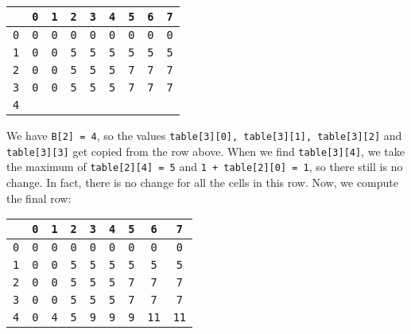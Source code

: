 \documentclass[a4paper, openany]{memoir}
\begin{document}
\begin{center}
    \begin{tabular}{|c|c|c|c|c|c|c|c|c|}
        \hline
         & \texttt{0} & \texttt{1} & \texttt{2} & \texttt{3} & \texttt{4} & \texttt{5} & \texttt{6} & \texttt{7} \\
        \hline
        \texttt{0} & \texttt{0} & \texttt{0} & \texttt{0} & \texttt{0} & \texttt{0} & \texttt{0} & \texttt{0} & \texttt{0} \\
        \hline
        \texttt{1} & \texttt{0} & \texttt{0} & \texttt{5} & \texttt{5} & \texttt{5} & \texttt{5} & \texttt{5} & \texttt{5} \\
        \hline
        \texttt{2} & \texttt{0} & \texttt{0} & \texttt{5} & \texttt{5} & \texttt{5} & \texttt{7} & \texttt{7} & \texttt{7} \\
        \hline
        \texttt{3} & \texttt{0} & \texttt{0} & \texttt{5} & \texttt{5} & \texttt{5} & \texttt{7} & \texttt{7} & \texttt{7} \\
        \hline
        \texttt{4} & & & & & & & & \\
        \hline
    \end{tabular}
\end{center}
We have \texttt{B[2] = 4}, so the values \texttt{table[3][0], table[3][1], table[3][2]} and \texttt{table[3][3]} get copied from the row above. When we find \texttt{table[3][4]}, we take the maximum of \texttt{table[2][4] = 5} and \texttt{1 + table[2][0] = 1}, so there still is no change. In fact, there is no change for all the cells in this row. Now, we compute the final row:
\begin{center}
    \begin{tabular}{|c|c|c|c|c|c|c|c|c|}
        \hline
         & \texttt{0} & \texttt{1} & \texttt{2} & \texttt{3} & \texttt{4} & \texttt{5} & \texttt{6} & \texttt{7} \\
        \hline
        \texttt{0} & \texttt{0} & \texttt{0} & \texttt{0} & \texttt{0} & \texttt{0} & \texttt{0} & \texttt{0} & \texttt{0} \\
        \hline
        \texttt{1} & \texttt{0} & \texttt{0} & \texttt{5} & \texttt{5} & \texttt{5} & \texttt{5} & \texttt{5} & \texttt{5} \\
        \hline
        \texttt{2} & \texttt{0} & \texttt{0} & \texttt{5} & \texttt{5} & \texttt{5} & \texttt{7} & \texttt{7} & \texttt{7} \\
        \hline
        \texttt{3} & \texttt{0} & \texttt{0} & \texttt{5} & \texttt{5} & \texttt{5} & \texttt{7} & \texttt{7} & \texttt{7} \\
        \hline
        \texttt{4} & \texttt{0} & \texttt{4} & \texttt{5} & \texttt{9} & \texttt{9} & \texttt{9} & \texttt{11} &  \texttt{11} \\
        \hline
    \end{tabular}
\end{center}
\end{document}
